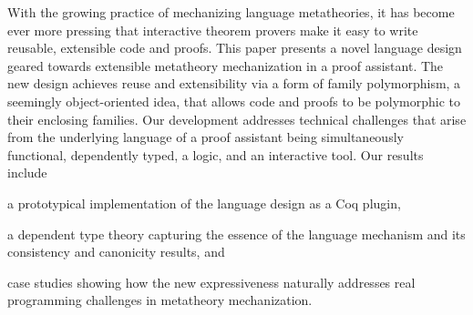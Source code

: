 
With the growing practice of mechanizing language metatheories,
it has become ever more pressing that interactive theorem provers 
make it easy to write reusable, extensible code and proofs.
%
This paper presents a novel language design geared towards extensible metatheory
mechanization in a proof assistant.
The new design achieves reuse and extensibility via a form of family
polymorphism, a seemingly object-oriented idea, that allows code and
proofs to be polymorphic to their enclosing families.
Our development addresses technical challenges that arise
from the underlying language of a proof assistant being simultaneously
functional, dependently typed, a logic, and an interactive tool.
%
Our results include
\begin{enumerate*}
\item a prototypical implementation of the language design as a Coq plugin,
\item a dependent type theory capturing the essence of the language mechanism
      and its consistency and canonicity results,
and 
\item case studies showing how the new expressiveness naturally addresses real
programming challenges in metatheory mechanization.
\end{enumerate*}